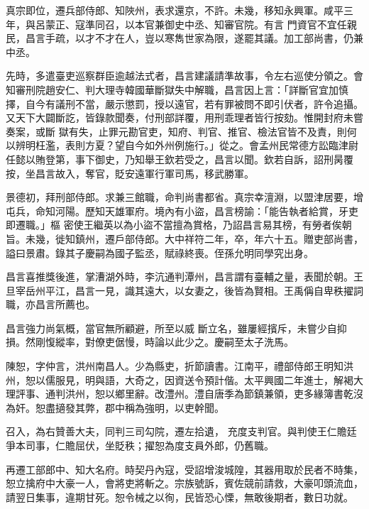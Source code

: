 \begin{pinyinscope}
 真宗即位，遷兵部侍郎、知陜州，表求還京，不許。未幾，移知永興軍。咸平三年，與呂蒙正、寇準同召，以本官兼御史中丞、知審官院。有言
 門資官不宜任親民，昌言手疏，以才不才在人，豈以寒雋世家為限，遂罷其議。加工部尚書，仍兼中丞。



 先時，多遣臺吏巡察群臣逾越法式者，昌言建議請準故事，令左右巡使分領之。會知審刑院趙安仁、判大理寺韓國華斷獄失中解職，昌言因上言：「詳斷官宜加慎擇，自今有議刑不當，嚴示懲罰，授以遠官，若有罪被問不即引伏者，許令追攝。又天下大闢斷訖，皆錄款聞奏，付刑部詳覆，用刑乖理者皆行按劾。惟開封府未嘗奏案，或斷
 獄有失，止罪元勘官吏，知府、判官、推官、檢法官皆不及責，則何以辨明枉濫，表則方夏？望自今如外州例施行。」從之。會孟州民常德方訟臨津尉任懿以賄登第，事下御史，乃知舉王欽若受之，昌言以聞。欽若自訴，詔刑昺覆按，坐昌言故入，奪官，貶安遠軍行軍司馬，移武勝軍。



 景德初，拜刑部侍郎。求兼三館職，命判尚書都省。真宗幸澶淵，以盟津居要，增屯兵，命知河陽。歷知天雄軍府。境內有小盜，昌言榜諭：「能告執者給賞，牙吏即遷職。」樞
 密使王繼英以為小盜不當擅為賞格，乃詔昌言易其榜，有勞者俟朝旨。未幾，徙知鎮州，遷戶部侍郎。大中祥符二年，卒，年六十五。贈吏部尚書，謚曰景肅。錄其子慶嗣為國子監丞，賦祿終喪。侄孫允明同學究出身。



 昌言喜推獎後進，掌漕湖外時，李沆通判潭州，昌言謂有臺輔之量，表聞於朝。王旦宰岳州平江，昌言一見，識其遠大，以女妻之，後皆為賢相。王禹偁自卑秩擢詞職，亦昌言所薦也。



 昌言強力尚氣概，當官無所顧避，所至以威
 斷立名，雖屢經擯斥，未嘗少自抑損。然剛愎縱率，對僚吏倨慢，時論以此少之。慶嗣至太子洗馬。



 陳恕，字仲言，洪州南昌人。少為縣吏，折節讀書。江南平，禮部侍郎王明知洪州，恕以儒服見，明與語，大奇之，因資送令預計偕。太平興國二年進士，解褐大理評事、通判洪州，恕以鄉里辭。改澧州。澧自唐季為節鎮兼領，吏多緣簿書乾沒為奸。恕盡擿發其弊，郡中稱為強明，以吏幹聞。



 召入，為右贊善大夫，同判三司勾院，遷左拾遺，
 充度支判官。與判使王仁贍廷爭本司事，仁贍屈伏，坐貶秩；擢恕為度支員外郎，仍舊職。



 再遷工部郎中、知大名府。時契丹內寇，受詔增浚城隍，其器用取於民者不時集，恕立擒府中大豪一人，會將吏將斬之。宗族號訴，賓佐競前請救，大豪叩頭流血，請翌日集事，違期甘死。恕令械之以徇，民皆恐心慄，無敢後期者，數日功就。




\end{pinyinscope}

